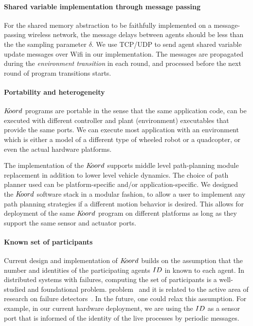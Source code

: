 \paragraph*{Shared variable implementation through message passing}
For the shared memory abstraction to be faithfully implemented on a message-passing wireless network, the message delays between agents should be less than the the sampling parameter $\delta$. We use TCP/UDP to send agent shared variable update messages over Wifi in our implementation. The messages are propagated during the \emph{environment transition} in each round, and processed before the next round of program transitions starts.

\paragraph*{Portability and heterogeneity}

$K\kern-2pt oord$ programs are portable in the sense that the same application code, can be executed with different controller and plant (environment) executables that provide the same ports. We can execute most application with an environment which is either a model of a different type of wheeled robot or a quadcopter, or even the actual hardware platforms. 

The implementation of the $K\kern-2pt oord$ supports middle level path-planning module replacement in addition to lower level vehicle dynamics. The  choice of path planner  used  can  be  platform-specific  and/or  application-specific. We designed the $K\kern-2pt oord$ software stack in a modular fashion, to allow a user to implement any path planning strategies if a different motion behavior is desired. This allows for deployment of the same $K\kern-2pt oord$ program on different platforms as long as they support the same sensor and actuator ports. 

\paragraph*{Known set of participants}
Current design and implementation of $K\kern-2pt oord$ builds on the assumption that the number and identities of the participating agents $ID$ in known to each agent. In distributed systems with failures, computing the set of participants is a well-studied and foundational problem. problem~\cite{AlistarhAGG2011} and it is related to the active area of research on failure detectors~\cite{Chandra:1996,delporte2004weakest}. In the future, one could  relax this  assumption. For example, in our current hardware deployment, we are using the $ID$ as a sensor port that is informed of the identity of the live processes by periodic messages. 

